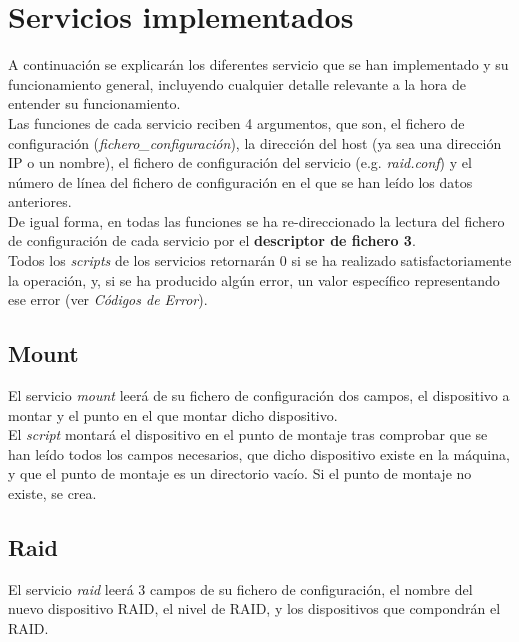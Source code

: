 \documentclass[12pt,a4paper, spanish]{article}
\begin{document}
\section{Servicios implementados}
\noindent A continuación se explicarán los diferentes servicio que se han implementado y su funcionamiento general, incluyendo cualquier detalle relevante a la hora de entender su funcionamiento.\\

Las funciones de cada servicio reciben 4 argumentos, que son, el fichero de configuración (\textit{fichero\_configuración}), la dirección del host (ya sea una dirección IP o un nombre), el fichero de configuración del servicio (e.g. \textit{raid.conf}) y el número de línea del fichero de configuración en el que se han leído los datos anteriores.\\

De igual forma, en todas las funciones se ha re-direccionado la lectura del fichero de configuración de cada servicio por el \textbf{descriptor de fichero 3}.\\

Todos los \textit{scripts} de los servicios retornarán 0 si se ha realizado satisfactoriamente la operación, y, si se ha producido algún error, un valor específico representando ese error (ver \textit{Códigos de Error}).


\subsection{Mount}
\noindent El servicio \textit{mount} leerá de su fichero de configuración dos campos, el dispositivo a montar y el punto en el que montar dicho dispositivo.\\

El \textit{script} montará el dispositivo en el punto de montaje tras comprobar que se han leído todos los campos necesarios, que dicho dispositivo existe en la máquina, y que el punto de montaje es un directorio vacío. Si el punto de montaje no existe, se crea.\\


\subsection{Raid}
\noindent El servicio \textit{raid} leerá 3 campos de su fichero de configuración, el nombre del nuevo dispositivo RAID, el nivel de RAID, y los dispositivos que compondrán el RAID.\\
\end{document}
